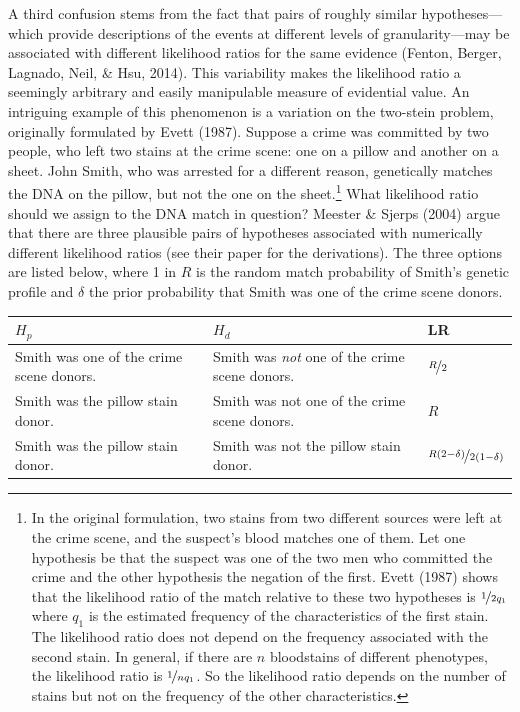 \documentclass[
  10pt,
  dvipsnames,enabledeprecatedfontcommands]{scrartcl}
\begin{document}
A third confusion stems from the fact that pairs of roughly similar
hypotheses---which provide descriptions of the events at different
levels of granularity---may be associated with different likelihood
ratios for the same evidence (Fenton, Berger, Lagnado, Neil, \& Hsu,
2014). This variability makes the likelihood ratio a seemingly arbitrary
and easily manipulable measure of evidential value. An intriguing
example of this phenomenon is a variation on the two-stein problem,
originally formulated by Evett (1987). Suppose a crime was committed by
two people, who left two stains at the crime scene: one on a pillow and
another on a sheet. John Smith, who was arrested for a different reason,
genetically matches the DNA on the pillow, but not the one on the
sheet.\footnote{In the original formulation, two stains from two
  different sources were left at the crime scene, and the suspect's
  blood matches one of them. Let one hypothesis be that the suspect was
  one of the two men who committed the crime and the other hypothesis
  the negation of the first. Evett (1987) shows that the likelihood
  ratio of the match relative to these two hypotheses is
  \(\nicefrac{1}{2q_1}\) where \(q_1\) is the estimated frequency of the
  characteristics of the first stain. The likelihood ratio does not
  depend on the frequency associated with the second stain. In general,
  if there are \(n\) bloodstains of different phenotypes, the likelihood
  ratio is \(\nicefrac{1}{nq_1}\). So the likelihood ratio depends on
  the number of stains but not on the frequency of the other
  characteristics.} What likelihood ratio should we assign to the DNA
match in question? Meester \& Sjerps (2004) argue that there are three
plausible pairs of hypotheses associated with numerically different
likelihood ratios (see their paper for the derivations). The three
options are listed below, where 1 in \(R\) is the random match
probability of Smith's genetic profile and \(\delta\) the prior
probability that Smith was one of the crime scene donors. \vspace{2mm}

\begin{center}
    \footnotesize
    \begin{tabular}{@{}p{5cm}p{5cm}l@{}}
        \toprule
        $H_p$ & $H_d$  & LR \\ \midrule
        Smith was one of the crime scene donors.   &  Smith was \textit{not} one of the crime scene donors. & $\nicefrac{R}{2}$   \\
        Smith was the pillow stain donor.     & Smith was not one of the crime scene donors.& $R$\\
        Smith was the pillow stain donor. & Smith was not the pillow stain donor. &  $\nicefrac{R(2-\delta)}{2(1-\delta)}$
        \\ \bottomrule
    \end{tabular}
\end{center}
\normalsize
\vspace{2mm}
\end{document}
